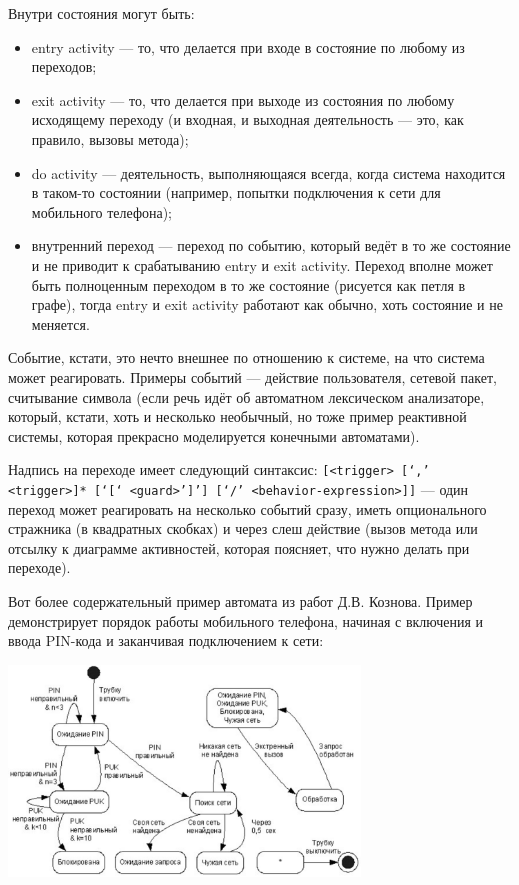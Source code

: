 \documentclass[a5paper]{article}
\begin{document}
Внутри состояния могут быть:

\begin{itemize}
    \item entry activity --- то, что делается при входе в состояние по любому из переходов;
    \item exit activity --- то, что делается при выходе из состояния по любому исходящему переходу (и входная, и выходная деятельность --- это, как правило, вызовы метода);
    \item do activity --- деятельность, выполняющаяся всегда, когда система находится в таком-то состоянии (например, попытки подключения к сети для мобильного телефона);
    \item внутренний переход --- переход по событию, который ведёт в то же состояние и не приводит к срабатыванию entry и exit activity. Переход вполне может быть полноценным переходом в то же состояние (рисуется как петля в графе), тогда entry и exit activity работают как обычно, хоть состояние и не меняется.
\end{itemize}

Событие, кстати, это нечто внешнее по отношению к системе, на что система может реагировать. Примеры событий --- действие пользователя, сетевой пакет, считывание символа (если речь идёт об автоматном лексическом анализаторе, который, кстати, хоть и несколько необычный, но тоже пример реактивной системы, которая прекрасно моделируется конечными автоматами).

Надпись на переходе имеет следующий синтаксис: \verb|[<trigger> [‘,’ <trigger>]* [‘[‘ <guard>’]’] [‘/’ <behavior-expression>]]| --- один переход может реагировать на несколько событий сразу, иметь опционального стражника (в квадратных скобках) и через слеш действие (вызов метода или отсылку к диаграмме активностей, которая поясняет, что нужно делать при переходе).

Вот более содержательный пример автомата из работ Д.В. Кознова. Пример демонстрирует порядок работы мобильного телефона, начиная с включения и ввода PIN-кода и заканчивая подключением к сети:

\begin{center}
    \includegraphics[width=0.7\textwidth]{stateTransitionExample2.png}
\end{center}
\end{document}
